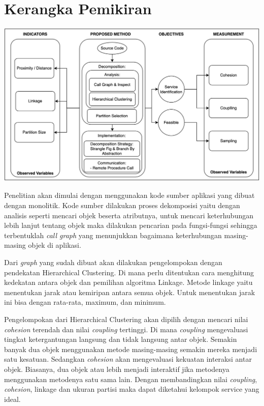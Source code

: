 \section{Kerangka Pemikiran}
\begin{center}
	\includegraphics[width=14cm]{img/bab_3/KerangkaPemikiran.png}
	\label{fig:kerangka_pemikiran}
\end{center}

Penelitian akan dimulai dengan menggunakan kode sumber aplikasi yang dibuat dengan monolitik. Kode sumber dilakukan proses dekomposisi yaitu dengan analisis seperti mencari objek beserta atributnya, untuk mencari keterhubungan lebih lanjut tentang objek maka dilakukan pencarian pada fungsi-fungsi sehingga terbentuklah \textit{call graph} yang menunjukkan bagaimana keterhubungan masing-masing objek di aplikasi.

Dari \textit{graph} yang sudah dibuat akan dilakukan pengelompokan dengan pendekatan Hierarchical Clustering. Di mana perlu ditentukan cara menghitung kedekatan antara objek dan pemilihan algoritma Linkage. Metode linkage yaitu menentukan jarak atau kemiripan antara semua objek. Untuk menentukan jarak ini bisa dengan rata-rata, maximum, dan minimum. 

Pengelompokan dari Hierarchical Clustering akan dipilih dengan mencari nilai \textit{cohesion} terendah dan  nilai \textit{coupling} tertinggi. Di mana \textit{coupling} mengevaluasi tingkat ketergantungan langsung dan tidak langsung antar objek. Semakin banyak dua objek menggunakan metode masing-masing semakin mereka menjadi satu kesatuan. Sedangkan  \textit{cohesion} akan mengevaluasi kekuatan interaksi antar objek. Biasanya, dua objek atau lebih menjadi interaktif jika metodenya menggunakan metodenya satu sama lain. Dengan membandingkan nilai  \textit{coupling}, \textit{cohesion}, linkage dan ukuran partisi maka dapat diketahui kelompok service yang ideal.

